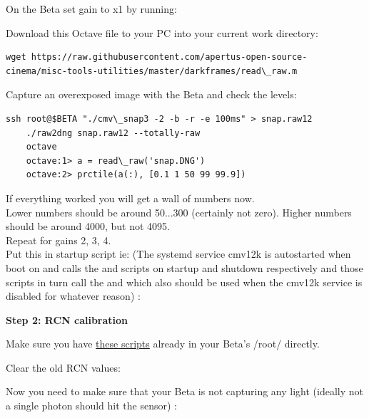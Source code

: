 On the Beta set gain to x1 by running: 
	
	
Download this Octave file to your PC into your current work directory: 
	
\begin{lstlisting}[breaklines=true, breakatwhitespace=true]
wget https://raw.githubusercontent.com/apertus-open-source-cinema/misc-tools-utilities/master/darkframes/read\_raw.m
\end{lstlisting}
	
Capture an overexposed image with the Beta and check the levels: 
	
\begin{lstlisting}[breaklines=true, breakatwhitespace=true]
	ssh root@$BETA "./cmv\_snap3 -2 -b -r -e 100ms" > snap.raw12
	./raw2dng snap.raw12 --totally-raw
	octave
	octave:1> a = read\_raw('snap.DNG')
	octave:2> prctile(a(:), [0.1 1 50 99 99.9])
\end{lstlisting}

If everything worked you will get a wall of numbers now.\\ 
	
Lower numbers should be around 50...300 (certainly not zero). Higher numbers should be around 4000, but not 4095.\\
	
Repeat for gains 2, 3, 4.\\
	
Put this in startup script ie:  (The systemd service cmv12k is autostarted when boot on and calls the  and  scripts on startup and shutdown respectively and those scripts in turn call the  and  which also should be used when the cmv12k service is disabled for whatever reason) : 
	
	
\textbf{Step 2: RCN calibration }
	
Make sure you have \href{https://github.com/apertus-open-source-cinema/beta-software/tree/master/beta-scripts}{these scripts} already in your Beta's /root/ directly.
	
Clear the old RCN values: 
	
 
	
Now you need to make sure that your Beta is not capturing any light (ideally not a single photon should hit the sensor) :\\
	
